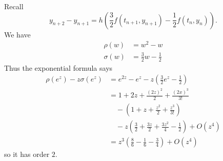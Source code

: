 \documentclass[a4paper]{article}
\begin{document}
\begin{eg}
  Recall
  \[
    y_{n + 2} - y_{n + 1} = h \left( \frac{3}{2}f(t_{n + 1}, y_{n + 1}) - \frac{1}{2}f(t_n, y_n) \right).
  \]
  We have
  \begin{align*}
    \rho(w) &= w^2 - w \\
    \sigma(w) &= \frac{3}{2}w - \frac{1}{2}
  \end{align*}
  Thus the exponential formula says
  \begin{align*}
    \rho(e^z) -z\sigma(e^z)
    &= e^{2z} - e^z - z (\frac{3}{2}e^z - \frac{1}{2}) \\
    &= 1 + 2z + \frac{(2z)^2}{2} + \frac{(2x)^3}{3!} \\
    &\quad - (1 + z + \frac{z^2}{2} + \frac{z^3}{3!}) \\
    &\quad -z(\frac{3}{2} + \frac{3z}{2} + \frac{3z^2}{4} - \frac{1}{2}) + O(z^4) \\
    &= z^3(\frac{8}{6} - \frac{1}{6} - \frac{3}{4}) + O(z^4)
  \end{align*}
  so it has order \(2\).
\end{eg}







\printindex

\iffalse
http://damtp.cam.ac.uk/user/hf323/L18-IB-NA/
\fi
\end{document}
